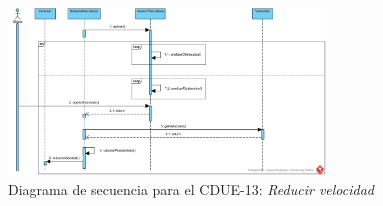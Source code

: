 \begin{figure}[h]
  \begin{center}
    \includegraphics[width=0.75\textwidth]{./img/diagramas_de_secuencia/CDUE-13.png}
  \end{center}
  \caption{Diagrama de secuencia para el CDUE-13: \textit{Reducir velocidad}}
  \label{img:reducir_velocidad}
\end{figure}
